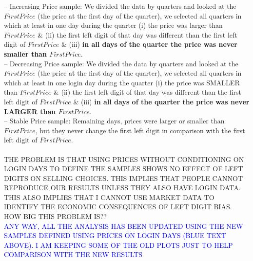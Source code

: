 -- Increasing Price sample: We divided the data by quarters and looked at the $FirstPrice$ (the price at the first day of the quarter), we selected all quarters in which at least in one day during the quarter (i) the price was larger than $FirstPrice$ \& (ii) the first left digit of that day was different than the first left digit of $FirstPrice$ \& (iii) \textbf{in all days of the quarter the price was never smaller than $FirstPrice$}. \\
-- Decreasing Price sample: We divided the data by quarters and looked at the $FirstPrice$ (the price at the first day of the quarter), we selected all quarters in which at least in one login day during the quarter (i) the price was SMALLER than $FirstPrice$ \& (ii) the first left digit of that day was different than the first left digit of $FirstPrice$ \& (iii) \textbf{in all days of the quarter the price was never LARGER than $FirstPrice$}. \\
-- Stable Price sample: Remaining days, prices were larger or smaller than $FirstPrice$, but they never change the first left digit in comparison with the first left digit of $FirstPrice$. \\ \\
THE PROBLEM IS THAT USING PRICES WITHOUT CONDITIONING ON LOGIN DAYS TO DEFINE THE SAMPLES SHOWS NO EFFECT OF LEFT DIGITS ON SELLING CHOICES. THIS IMPLIES THAT PEOPLE CANNOT REPRODUCE OUR RESULTS UNLESS THEY ALSO HAVE LOGIN DATA. THIS ALSO IMPLIES THAT I CANNOT USE MARKET DATA TO IDENTIFY THE ECONOMIC CONSEQUENCES OF LEFT DIGIT BIAS. HOW BIG THIS PROBLEM IS?? \\
\textcolor{blue}{ ANY WAY, ALL THE ANALYSIS HAS BEEN UPDATED USING THE NEW SAMPLES DEFINED USING PRICES ON LOGIN DAYS (BLUE TEXT ABOVE). I AM KEEPING SOME OF THE OLD PLOTS JUST TO HELP COMPARISON WITH THE NEW RESULTS}



\clearpage

